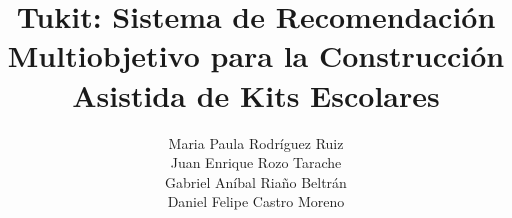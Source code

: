 \documentclass{article}
\title{Tukit: Sistema de Recomendación Multiobjetivo para la Construcción Asistida de Kits Escolares}
\author{
\begin{tabular}{c}
    Maria Paula Rodríguez Ruiz \\
    Juan Enrique Rozo Tarache \\
    Gabriel Aníbal Riaño Beltrán \\
    Daniel Felipe Castro Moreno
\end{tabular}
}
\begin{document}
    \renewcommand{\contentsname}{TABLA DE CONTENIDO}
    \renewcommand{\listfigurename}{LISTA DE FIGURAS}
    \renewcommand{\listtablename}{LISTA DE TABLAS}
    \def\tablename{Tabla}
    
    

    
    
    
    
    \tableofcontents
    \newpage
    \listoffigures
    \newpage
    \listoftables

    
    
    
    
    
    
    
    
    
    
    
    
\end{document}
